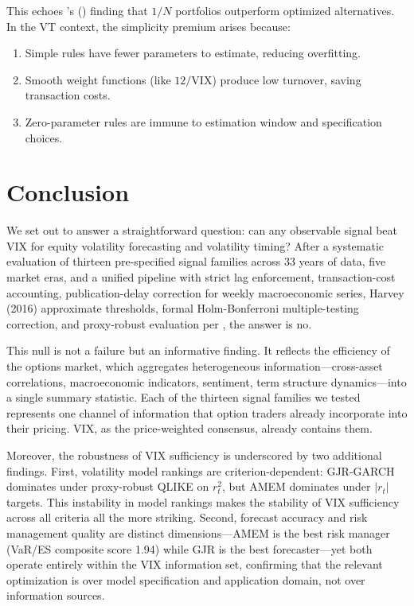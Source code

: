 \documentclass[12pt,a4paper]{article}
\begin{document}
This echoes \citeauthor{demiguel2009}'s (\citeyear{demiguel2009}) finding that $1/N$ portfolios outperform optimized alternatives. In the VT context, the simplicity premium arises because:
\begin{enumerate}
    \item Simple rules have fewer parameters to estimate, reducing overfitting.
    \item Smooth weight functions (like $12/\text{VIX}$) produce low turnover, saving transaction costs.
    \item Zero-parameter rules are immune to estimation window and specification choices.
\end{enumerate}


\section{Conclusion}
\label{sec:conclusion}

We set out to answer a straightforward question: can any observable signal beat VIX for equity volatility forecasting and volatility timing? After a systematic evaluation of thirteen pre-specified signal families across 33 years of data, five market eras, and a unified pipeline with strict lag enforcement, transaction-cost accounting, publication-delay correction for weekly macroeconomic series, Harvey (2016) approximate thresholds, formal Holm-Bonferroni multiple-testing correction, and proxy-robust evaluation per \citet{patton2011}, the answer is no.

This null is not a failure but an informative finding. It reflects the efficiency of the options market, which aggregates heterogeneous information---cross-asset correlations, macroeconomic indicators, sentiment, term structure dynamics---into a single summary statistic. Each of the thirteen signal families we tested represents one channel of information that option traders already incorporate into their pricing. VIX, as the price-weighted consensus, already contains them.

Moreover, the robustness of VIX sufficiency is underscored by two additional findings. First, volatility model rankings are criterion-dependent: GJR-GARCH dominates under proxy-robust QLIKE on $r_t^2$, but AMEM dominates under $|r_t|$ targets. This instability in model rankings makes the stability of VIX sufficiency across all criteria all the more striking. Second, forecast accuracy and risk management quality are distinct dimensions---AMEM is the best risk manager (VaR/ES composite score 1.94) while GJR is the best forecaster---yet both operate entirely within the VIX information set, confirming that the relevant optimization is over model specification and application domain, not over information sources.
\end{document}
